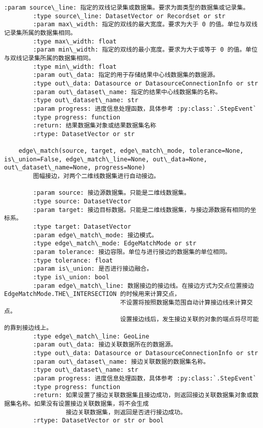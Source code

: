 \documentclass[11pt]{article}
\begin{document}
\begin{Verbatim}[commandchars=\\\{\}]
        :param source\_line: 指定的双线记录集或数据集。要求为面类型的数据集或记录集。
        :type source\_line: DatasetVector or Recordset or str
        :param max\_width: 指定的双线的最大宽度。要求为大于 0 的值。单位与双线记录集所属的数据集相同。
        :type max\_width: float
        :param min\_width: 指定的双线的最小宽度。要求为大于或等于 0 的值。单位与双线记录集所属的数据集相同。
        :type min\_width: float
        :param out\_data: 指定的用于存储结果中心线数据集的数据源。
        :type out\_data: Datasource or DatasourceConnectionInfo or str
        :param out\_dataset\_name: 指定的结果中心线数据集的名称。
        :type out\_dataset\_name: str
        :param progress: 进度信息处理函数，具体参考 :py:class:`.StepEvent`
        :type progress: function
        :return: 结果数据集对象或结果数据集名称
        :rtype: DatasetVector or str
    
    edge\_match(source, target, edge\_match\_mode, tolerance=None, is\_union=False, edge\_match\_line=None, out\_data=None, out\_dataset\_name=None, progress=None)
        图幅接边，对两个二维线数据集进行自动接边。
        
        :param source: 接边源数据集。只能是二维线数据集。
        :type source: DatasetVector
        :param target: 接边目标数据。只能是二维线数据集，与接边源数据有相同的坐标系。
        :type target: DatasetVector
        :param edge\_match\_mode: 接边模式。
        :type edge\_match\_mode: EdgeMatchMode or str
        :param tolerance: 接边容限。单位与进行接边的数据集的单位相同。
        :type tolerance: float
        :param is\_union: 是否进行接边融合。
        :type is\_union: bool
        :param edge\_match\_line: 数据接边的接边线。在接边方式为交点位置接边 EdgeMatchMode.THE\_INTERSECTION 的时候用来计算交点，
                                不设置将按照数据集范围自动计算接边线来计算交点。
                                设置接边线后，发生接边关联的对象的端点将尽可能的靠到接边线上。
        :type edge\_match\_line: GeoLine
        :param out\_data: 接边关联数据所在的数据源。
        :type out\_data: Datasource or DatasourceConnectionInfo or str
        :param out\_dataset\_name: 接边关联数据的数据集名称。
        :type out\_dataset\_name: str
        :param progress: 进度信息处理函数，具体参考 :py:class:`.StepEvent`
        :type progress: function
        :return: 如果设置了接边关联数据集且接边成功，则返回接边关联数据集对象或数据集名称。如果没有设置接边关联数据集，将不会生成
                 接边关联数据集，则返回是否进行接边成功。
        :rtype: DatasetVector or str or bool
    

\end{Verbatim}
\end{document}

